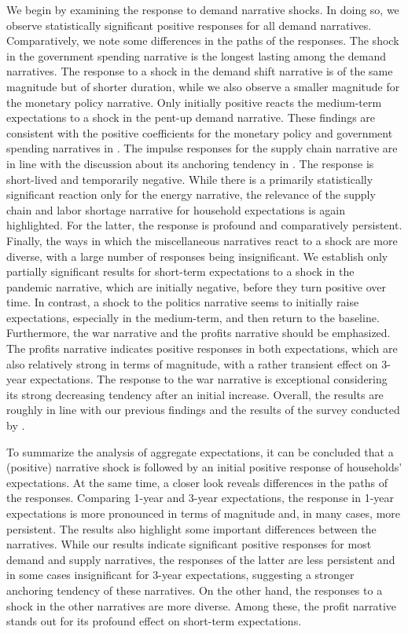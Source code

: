 We begin by examining the response to demand narrative shocks. In doing so, we observe statistically significant positive responses for all demand narratives. Comparatively, we note some differences in the paths of the responses. The shock in the government spending narrative is the longest lasting among the demand narratives. The response to a shock in the demand shift narrative is of the same magnitude but of shorter duration, while we also observe a smaller magnitude for the monetary policy narrative. Only initially positive reacts the medium-term expectations to a shock in the pent-up demand narrative. These findings are consistent with the positive coefficients for the monetary policy and government spending narratives in \cite{Andre.2023}. The impulse responses for the supply chain narrative are in line with the discussion about its anchoring tendency in \cite{Andre.2023, Demgensky.2023}. The response is short-lived and temporarily negative. While there is a primarily statistically significant reaction only for the energy narrative, the relevance of the supply chain and labor shortage narrative for household expectations is again highlighted. For the latter, the response is profound and comparatively persistent. Finally, the ways in which the miscellaneous narratives react to a shock are more diverse, with a large number of responses being insignificant. We establish only partially significant results for short-term expectations to a shock in the pandemic narrative, which are initially negative, before they turn positive over time. In contrast, a shock to the politics narrative seems to initially raise expectations, especially in the medium-term, and then return to the baseline. Furthermore, the war narrative and the profits narrative should be emphasized. The profits narrative indicates positive responses in both expectations, which are also relatively strong in terms of magnitude, with a rather transient effect on 3-year expectations. The response to the war narrative is exceptional considering its strong decreasing tendency after an initial increase. Overall, the results are roughly in line with our previous findings and the results of the survey conducted by \cite{Andre.2023, Stantcheva.2024, Demgensky.2023}. 




To summarize the analysis of aggregate expectations, it can be concluded that a (positive) narrative shock is followed by an initial positive response of households' expectations. At the same time, a closer look reveals differences in the paths of the responses. Comparing 1-year and 3-year expectations, the response in 1-year expectations is more pronounced in terms of magnitude and, in many cases, more persistent. The results also highlight some important differences between the narratives. While our results indicate significant positive responses for most demand and supply narratives, the responses of the latter are less persistent and in some cases insignificant for 3-year expectations, suggesting a stronger anchoring tendency of these narratives. On the other hand, the responses to a shock in the other narratives are more diverse. Among these, the profit narrative stands out for its profound effect on short-term expectations.


